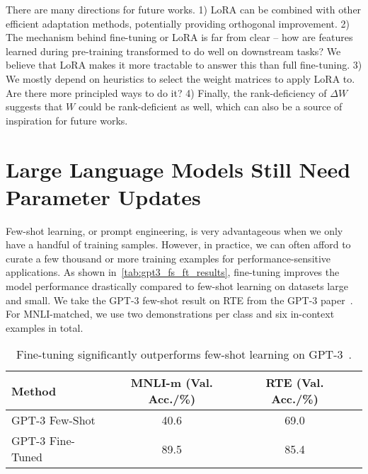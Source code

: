 \documentclass{article} %
\begin{document}
There are many directions for future works.
1) LoRA can be combined with other efficient adaptation methods, potentially providing orthogonal improvement.
2) The mechanism behind fine-tuning or LoRA is far from clear -- how are features learned during pre-training transformed to do well on downstream tasks?
We believe that LoRA makes it more tractable to answer this than full fine-tuning.
3) We mostly depend on heuristics to select the weight matrices to apply LoRA to.
Are there more principled ways to do it?
4) Finally, the rank-deficiency of $\Delta W$ suggests that $W$ could be rank-deficient as well, which can also be a source of inspiration for future works.






\appendix

\section{Large Language Models Still Need Parameter Updates}
\label{app:fewshot_vs_finetune}

Few-shot learning, or prompt engineering, is very advantageous when we only have a handful of training samples.
However, in practice, we can often afford to curate a few thousand or more training examples for performance-sensitive applications.
As shown in~\autoref{tab:gpt3_fs_ft_results}, fine-tuning improves the model performance drastically compared to few-shot learning on datasets large and small.
We take the GPT-3 few-shot result on RTE from the GPT-3 paper~\citep{brown_language_2020}.
For MNLI-matched, we use two demonstrations per class and six in-context examples in total.


\begin{table}[h]
\centering
\begin{tabular}{l|ccc}
\hline
\toprule
Method           & MNLI-m (Val. Acc./\%) & RTE (Val. Acc./\%) \\
\midrule
GPT-3 Few-Shot   & 40.6 & 69.0 \\
GPT-3 Fine-Tuned & 89.5 & 85.4 \\
\bottomrule
\end{tabular}
\caption{Fine-tuning significantly outperforms few-shot learning on GPT-3~\citep{brown_language_2020}.  }
\label{tab:gpt3_fs_ft_results}
\end{table}
\end{document}
